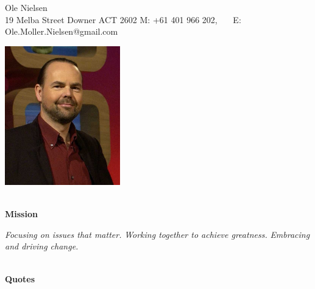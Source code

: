 \documentclass[11pt,a4paper]{article}
\begin{document}
\begin{center}
  Ole Nielsen \\
  19 Melba Street
  Downer ACT 2602
  M: +61 401 966 202, \ \ \ E: Ole.Moller.Nielsen@gmail.com
\end{center}
\begin{center}
\includegraphics[width=50mm,keepaspectratio=true]{ole.jpg}
\end{center}

\begin{center}
  \hrulefill \\
  {\bf Mission} \\[-0.2cm]
  \hrulefill
\end{center}
\emph{Focusing on issues that matter.}
\emph{Working together to achieve greatness.}
\emph{Embracing and driving change.}

\begin{center}
  \hrulefill \\
  {\bf Quotes} \\[-0.2cm]
  \hrulefill
\end{center}
\end{document}
